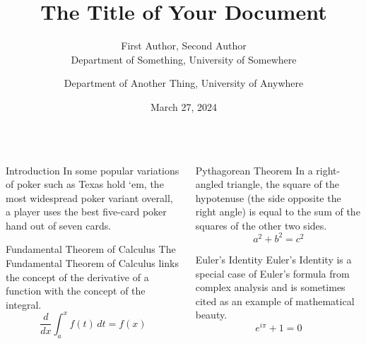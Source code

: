 \documentclass[final]{beamer}
\title{The Title of Your Document}
\author{
    First Author, Second Author \\
    Department of Something, University of Somewhere \and
    Department of Another Thing, University of Anywhere
}
\date{March 27, 2024} %
\begin{document}
\maketitle


\begin{frame}[t]
\begin{columns}[t]

\begin{column}{.48\linewidth}


\begin{block}{Introduction}
    In some popular variations of poker such as Texas hold `em, 
    the most widespread poker variant overall, a player uses the best five-card poker hand out of seven cards.
\end{block}

\begin{block}{Fundamental Theorem of Calculus}
The Fundamental Theorem of Calculus links the concept of the derivative of a function with the concept of the integral.
\[
\frac{d}{dx} \int_a^x f(t)\, dt = f(x)
\]
\end{block}
\end{column}

\begin{column}{.48\linewidth}
\begin{block}{Pythagorean Theorem}
In a right-angled triangle, the square of the hypotenuse (the side opposite the right angle) is equal to the sum of the squares of the other two sides.
\[
a^2 + b^2 = c^2
\]
\end{block}

\begin{block}{Euler's Identity}
Euler's Identity is a special case of Euler's formula from complex analysis and is sometimes cited as an example of mathematical beauty.
\[
e^{i\pi} + 1 = 0
\]
\end{block}
\end{column}


\end{columns}
\end{frame}
\end{document}
